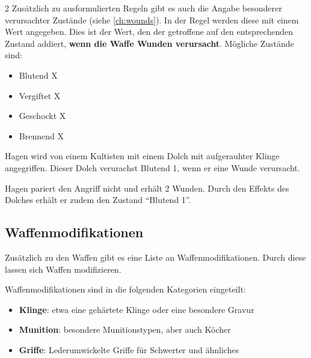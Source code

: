 \begin{multicols}{2}
Zusätzlich zu ausformulierten Regeln gibt es auch die Angabe besonderer verursachter Zustände (siehe \cref{ch:wounds}). In der Regel werden diese mit einem Wert angegeben. Dies ist der Wert, den der getroffene auf den entsprechenden Zustand addiert, \textbf{wenn die Waffe Wunden verursacht}. Mögliche Zustände sind:
\begin{itemize}
    \item Blutend X
    \item Vergiftet X
    \item Geschockt X
    \item Brennend X
\end{itemize}

\begin{pexample}[Beispiel]
Hagen wird von einem Kultisten mit einem Dolch mit aufgerauhter Klinge angegriffen. Dieser Dolch verurachst Blutend 1, wenn er eine Wunde verursacht.

Hagen pariert den Angriff nicht und erhält 2 Wunden. Durch den Effekts des Dolches erhält er zudem den Zustand ``Blutend 1''.
\end{pexample}

\subsection{Waffenmodifikationen}

Zusätzlich zu den Waffen gibt es eine Liste an Waffenmodifikationen. Durch diese lassen sich Waffen modifizieren.


Waffenmodifikationen sind in die folgenden Kategorien eingeteilt:
\begin{itemize}
    \item \textbf{Klinge}: etwa eine gehärtete Klinge oder eine besondere Gravur
    \item \textbf{Munition}: besondere Munitionstypen, aber auch Köcher
    \item \textbf{Griffe}: Lederumwickelte Griffe für Schwerter und ähnliches
\end{itemize}


\end{multicols}
